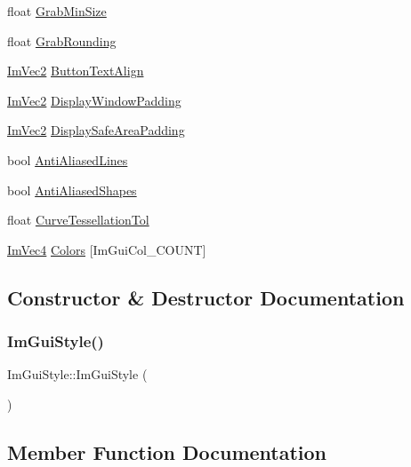 \begin{DoxyCompactItemize}
\item 
float \hyperlink{struct_im_gui_style_a04db033d001b343815cdcd2491576ef7}{Grab\+Min\+Size}
\item 
float \hyperlink{struct_im_gui_style_a42369d83032545066803a7db62936e8f}{Grab\+Rounding}
\item 
\hyperlink{struct_im_vec2}{Im\+Vec2} \hyperlink{struct_im_gui_style_a17246b12f4e069229d21808a87f78514}{Button\+Text\+Align}
\item 
\hyperlink{struct_im_vec2}{Im\+Vec2} \hyperlink{struct_im_gui_style_ab06d6f0c6c5f36ab0c14688448de66f6}{Display\+Window\+Padding}
\item 
\hyperlink{struct_im_vec2}{Im\+Vec2} \hyperlink{struct_im_gui_style_a8dd02a6a031ec8667e76aab1e28755bd}{Display\+Safe\+Area\+Padding}
\item 
bool \hyperlink{struct_im_gui_style_a0164b54454297971d40f3578b2c1ffeb}{Anti\+Aliased\+Lines}
\item 
bool \hyperlink{struct_im_gui_style_ae3c6b2f226fe51631352a637f3defabb}{Anti\+Aliased\+Shapes}
\item 
float \hyperlink{struct_im_gui_style_a41eb9377b63b8b85ab807c28e00198e9}{Curve\+Tessellation\+Tol}
\item 
\hyperlink{struct_im_vec4}{Im\+Vec4} \hyperlink{struct_im_gui_style_a2b4941240a38d1300c39a7fa4f03d0a3}{Colors} \mbox{[}Im\+Gui\+Col\+\_\+\+C\+O\+U\+NT\mbox{]}
\end{DoxyCompactItemize}


\subsection{Constructor \& Destructor Documentation}
\hypertarget{struct_im_gui_style_ab0a3ffb3aeec3e6b09b9bde812b28369}{}\label{struct_im_gui_style_ab0a3ffb3aeec3e6b09b9bde812b28369} 
\subsubsection{\texorpdfstring{Im\+Gui\+Style()}{ImGuiStyle()}}
{\footnotesize\ttfamily Im\+Gui\+Style\+::\+Im\+Gui\+Style (\begin{DoxyParamCaption}{ }\end{DoxyParamCaption})}



\subsection{Member Function Documentation}
\hypertarget{struct_im_gui_style_a7c9d3e0974a239f65e433cc952be0627}{}\label{struct_im_gui_style_a7c9d3e0974a239f65e433cc952be0627} 
